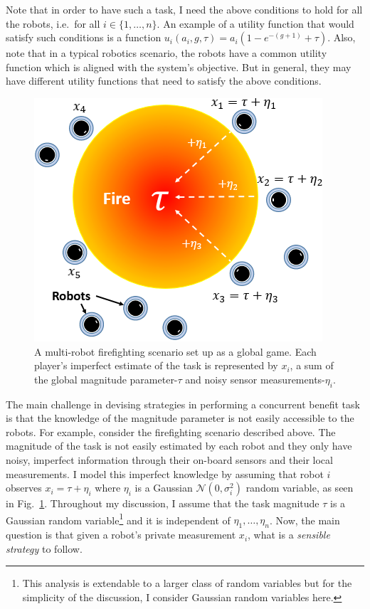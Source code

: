 \documentclass[defaultstyle,12pt]{proposal}
\begin{document}
Note that in order to have such a task, I need the above conditions to hold for all the robots, i.e.\ for all $i\in\{1,\ldots,n\}$.
An example of a utility function that would satisfy such conditions is a function $u_i(a_i,g,\tau)=a_i(1-e^{-(g+1)}+\tau)$. Also, note that in a typical robotics scenario, the robots have a common utility function which is aligned with the system's objective. But in general, they may have different utility functions that need to satisfy the above conditions. 

\begin{figure}[!htb]
\centering\includegraphics[width=0.65\columnwidth]{../assets/globalgamesetup.png}
\centering\caption{A multi-robot firefighting scenario set up as a global game. Each player's imperfect estimate of the task is represented by $x_i$, a sum of the global magnitude parameter-$\tau$ and noisy sensor measurements-$\eta_i$.}\vspace{-10px}\label{fig:ggsetup}
\end{figure}

The main challenge in devising strategies in performing a concurrent benefit task is that the knowledge of the magnitude parameter is not easily accessible to the robots. For example, consider the firefighting scenario described above. The magnitude of the task is not easily estimated by each robot and they only have noisy, imperfect information through their on-board sensors and their local measurements.  I model this imperfect knowledge by assuming that robot $i$ observes $x_i=\tau+\eta_i$ where $\eta_i$ is a Gaussian $\mathcal{N}(0,\sigma_i^2)$ random variable, as seen in Fig.~\ref{fig:ggsetup}. Throughout my discussion, I assume that the task magnitude $\tau$ is a Gaussian random variable\footnote{This analysis is extendable to a larger class of random variables but for the simplicity of the discussion, I consider Gaussian random variables here.} and it is independent of $\eta_1,\ldots,\eta_n$. Now, the main question is that given a robot's private measurement $x_i$, what is a \emph{sensible strategy} to follow. 
\end{document}
